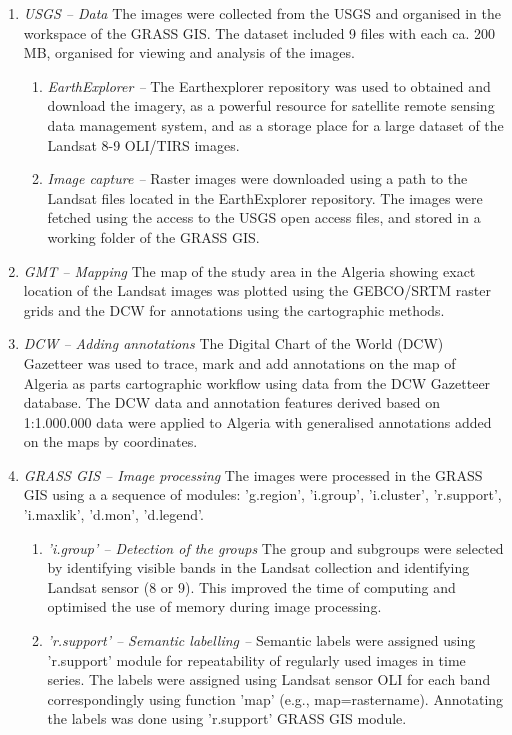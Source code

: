 \documentclass[asi,article,submit,pdftex,moreauthors]{Definitions/mdpi}
\begin{document}
\begin{enumerate}
\itemsep0em
	\item \emph{USGS -- Data } The images were collected from the USGS and organised in the workspace of the GRASS GIS. The dataset included 9 files with each ca. 200 MB, organised for viewing and analysis of the images. 
	\begin{enumerate}
		\item \emph{EarthExplorer -- } The Earthexplorer repository was used to obtained and download the imagery, as a powerful resource for satellite remote sensing data management system, and as a storage place for a large dataset of the Landsat 8-9 OLI/TIRS images.
		\item \emph{Image capture -- } Raster images were downloaded using a path to the Landsat files located in the EarthExplorer repository. The images were fetched using the access to the USGS open access files, and stored in a working folder of the GRASS GIS.		
	\end{enumerate}
	\item \emph{GMT -- Mapping } The map of the study area in the Algeria showing exact location of the Landsat images was plotted using the GEBCO/SRTM raster grids and the DCW for annotations using the cartographic methods.	
	\item \emph{DCW -- Adding annotations} The Digital Chart of the World (DCW) Gazetteer was used to trace, mark and add annotations on the map of Algeria as parts cartographic workflow using data from the DCW Gazetteer database. The DCW data and annotation features derived based on 1:1.000.000 data were applied to Algeria with generalised annotations added on the maps by coordinates.	
	\item \emph{GRASS GIS -- Image processing} The images were processed in the GRASS GIS using a a sequence of modules: 'g.region', 'i.group', 'i.cluster', 'r.support', 'i.maxlik', 'd.mon', 'd.legend'.	
		\begin{enumerate}
			\item \emph{'i.group' -- Detection of the groups} The group and subgroups were selected by identifying visible bands in the Landsat collection and identifying Landsat sensor (8 or 9). This improved the time of computing and optimised the use of memory during image processing.  
			\item \emph{'r.support' -- Semantic labelling --} Semantic labels were assigned using 'r.support' module for repeatability of regularly used images in time series. The labels were assigned using Landsat sensor OLI for each band correspondingly using function 'map' (e.g., map=rastername). Annotating the labels was done using 'r.support' GRASS GIS module.

\end{enumerate}
\end{enumerate}
\end{document}
